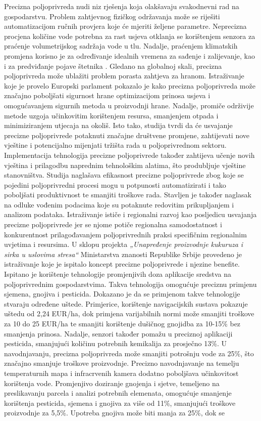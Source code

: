 Precizna poljoprivreda nudi niz rješenja koja olakšavaju svakodnevni rad na gospodarstvu. Problem zahtjevnog fizičkog održavanja može se riješiti automatizacijom ručnih provjera koje će mjeriti željene parametre. Neprecizna procjena količine vode potrebna za rast usjeva otklanja se korištenjem senzora za praćenje volumetrijskog sadržaja vode u tlu. Nadalje, praćenjem klimatskih promjena korisno je za određivanje idealnih vremena za sađenje i zalijevanje, kao i za predviđanje pojave štetnika \cite{iotnet_usecase}. Gledano na globalnoj skali, precizna poljoprivreda može ublažiti problem porasta zahtjeva za hranom. Istraživanje koje je provelo Europski parlament \cite{eu_study} pokazalo je kako precizna poljoprivreda može značajno poboljšati sigurnost hrane optimizacijom prinosa usjeva i omogućavanjem sigurnih metoda u proizvodnji hrane. Nadalje, promiče održivije metode uzgoja učinkovitim korištenjem resursa, smanjenjem otpada i minimiziranjem utjecaja na okoliš. Isto tako, studija tvrdi da će usvajanje precizne poljoprivrede potaknuti značajne društvene promjene, zahtijevati nove vještine i potencijalno mijenjati tržišta rada u poljoprivrednom sektoru. Implementacija tehnologija precizne poljoprivrede također zahtijeva učenje novih vještina i prilagodbu naprednim tehnološkim alatima, što produbljuje vještine stanovništva. Studija naglašava efikasnost precizne poljoprivrede zbog koje se pojedini poljoprivredni procesi mogu u potpunosti automatizirati i tako poboljšati produktivnost te smanjiti troškove rada. Stavljen je također naglasak na odluke vođenim podacima  koje su potaknute redovitim prikupljanjem i analizom podataka. Istraživanje ističe i regionalni razvoj kao posljedicu usvajanja precizne poljoprivrede jer se njome potiče regionalna samodostatnost i konkurentnost prilagođavanjem poljoprivrednih praksi specifičnim regionalnim uvjetima i resursima. U sklopu projekta \textit{„Unapređenje proizvodnje kukuruza i sirka u uslovima stresa“} Ministarstva znanosti Republike Srbije provedeno je istraživanje \cite{srbija_study} koje je ispitalo koncept precizne poljoprivrede i njezine benefite. Ispitano je korištenje tehnologije promjenjivih doza aplikacije sredstva  na poljoprivrednim gospodarstvima. Takva tehnologija omogućuje preciznu primjenu sjemena, gnojiva i pesticida. Dokazano je da se primjenom takve tehnologije stvaraju određene uštede. Primjerice, korištenje navigacijskih sustava pokazuje uštedu od 2,24 EUR/ha, dok primjena varijabilnih normi može smanjiti troškove za 10 do 25 EUR/ha te smanjiti korištenje dušičnog gnojidba za 10-15\% bez smanjenja prinosa. Nadalje, senzori također pomažu u preciznoj aplikaciji pesticida, smanjujući količinu potrebnih kemikalija za prosječno 13\%. U navodnjavanju, precizna poljoprivreda može smanjiti potrošnju vode za 25\%, što značajno smanjuje troškove proizvodnje. Precizno navodnjavanje na temelju temperaturnih mapa i infracrvenih kamera dodatno poboljšava učinkovitost korištenja vode. Promjenjivo doziranje gnojenja i sjetve, temeljeno na preslikavanju parcela i analizi potrebnih elemenata, omogućuje smanjenje korištenja pesticida, sjemena i gnojiva za više od 11\%, smanjujući troškove proizvodnje za 5,5\%. Upotreba gnojiva može biti manja za 25\%, dok se 